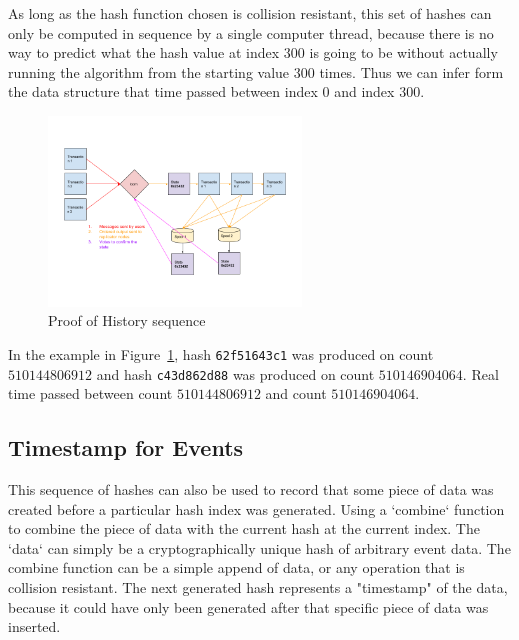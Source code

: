 \documentclass[12pt]{article}
\begin{document}
As long as the hash function chosen is collision resistant, this set of hashes can only be computed in sequence by a single computer thread, because there is no way to predict what the hash value at index $300$ is going to be without actually running the algorithm from the starting value $300$ times.  Thus we can infer form the data structure that time passed between index $0$ and index $300$.

\begin{figure}
  \begin{center}
    \centering
    \includegraphics[width=0.6\textwidth]{figures/fig_2.png}
    \caption[Figure 2]{Proof of History sequence\label{fig:poh_seq}}
  \end{center}
  \end{figure}

In the example in Figure~\ref{fig:poh_seq}, hash \texttt{62f51643c1} was produced on
count $510144806912$ and hash \texttt{c43d862d88} was produced on
count $510146904064$. Real time passed between count $510144806912$
and count $510146904064$.

\subsection{Timestamp for Events}

This sequence of hashes can also be used to record that some piece of data was created before a particular hash index was generated. Using a `combine` function to combine the piece of data with the current hash at the current index. The `data` can simply be a cryptographically unique hash of arbitrary event data. The combine function can be a simple append of data, or any operation that is collision resistant. The next generated hash represents a "timestamp" of the data, because it could have only been generated after that specific piece of data was inserted.\\
\end{document}
